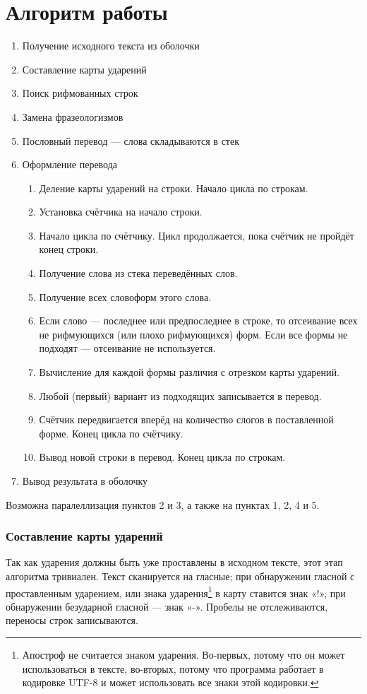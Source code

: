 \chapter{Алгоритм работы}

\begin{enumerate}
\item Получение исходного текста из оболочки
\item Составление карты ударений
\item Поиск рифмованных строк
\item Замена фразеологизмов
\item Пословный перевод — слова складываются в стек
\item Оформление перевода
\begin{enumerate}
 \item Деление карты ударений на строки. Начало цикла по строкам.
 \item Установка счётчика на начало строки.
 \item Начало цикла по счётчику. Цикл продолжается, пока счётчик не пройдёт конец строки.
 \item Получение слова из стека переведённых слов.
 \item Получение всех словоформ этого слова.
 \item Если слово — последнее или предпоследнее в строке, то отсеивание всех не рифмующихся (или плохо рифмующихся) форм. Если все формы не подходят — отсеивание не используется.
 \item Вычисление для каждой формы различия с отрезком карты ударений.
 \item Любой (первый) вариант из подходящих записывается в перевод.
 \item Счётчик передвигается вперёд на количество слогов в поставленной форме. Конец цикла по счётчику.
 \item Вывод новой строки в перевод. Конец цикла по строкам.
\end{enumerate}
\item Вывод результата в оболочку
\end{enumerate}

Возможна паралеллизация пунктов 2 и 3, а также на пунктах 1, 2, 4 и 5.

\subsection{Составление карты ударений}

Так как ударения должны быть уже проставлены в исходном тексте, этот этап алгоритма тривиален. Текст сканируется на гласные; при обнаружении гласной с проставленным ударением, или знака ударения\footnote{Апостроф не считается знаком ударения. Во-первых, потому что он может использоваться в тексте, во-вторых, потому что программа работает в кодировке UTF-8 и может использовать все знаки этой кодировки.} в карту ставится знак «!», при обнаружении безударной гласной — знак «-». Пробелы не отслеживаются, переносы строк записываются.

